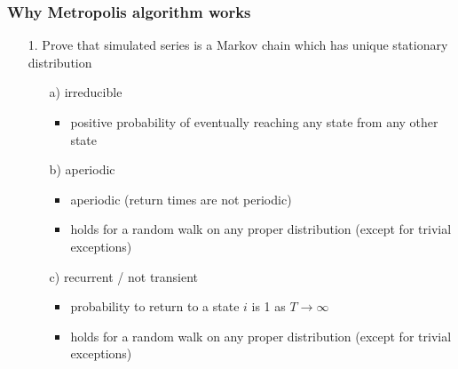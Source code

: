 \documentclass[10pt]{beamer}
\begin{document}
\begin{frame}

\frametitle{Why Metropolis algorithm works}

  \begin{itemize}
  \item[1.] Prove that simulated series is a Markov chain
    which has unique stationary distribution
    \begin{itemize}
    \item[a)] irreducible
      \begin{itemize}
      \item<2->[=] positive probability of eventually reaching any
        state from any other state
      \end{itemize}
    \item[b)] aperiodic
      \begin{itemize}
      \item<3->[=] aperiodic (return times are not periodic)
      \item<3->[-] holds for a random walk on any proper distribution (except for trivial exceptions)
      \end{itemize}
    \item[c)] recurrent / not transient
      \begin{itemize}
      \item<4->[=] probability to return to a state $i$ is 1 as $T\rightarrow \infty$
      \item<4->[-] holds for a random walk on any proper distribution (except for trivial exceptions)
      \end{itemize}
    \end{itemize}
  \end{itemize}

\end{frame}
\end{document}
